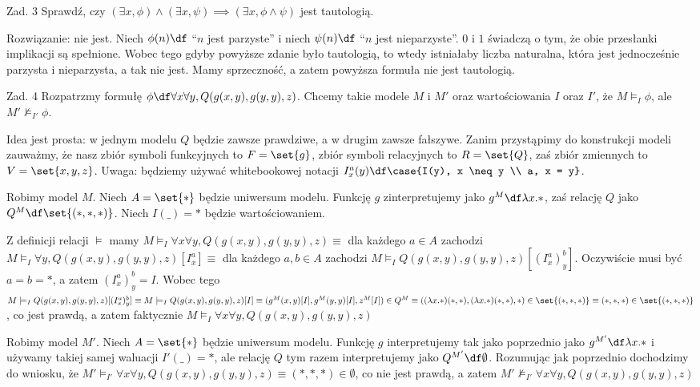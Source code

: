 \documentclass[11pt]{article}
\begin{document}
	\newpage
	
	\par Zad. 3 Sprawdź, czy $(\exists x, \phi) \land (\exists x, \psi) \implies (\exists x, \phi \land \psi)$ jest tautologią.
	\par Rozwiązanie: nie jest. Niech $\phi(n) \df $ ``$n$ jest parzyste'' i niech $\psi(n) \df $ ``$n$ jest nieparzyste''. $0$ i $1$ świadczą o tym, że obie przesłanki implikacji są spełnione. Wobec tego gdyby powyższe zdanie było tautologią, to wtedy istniałaby liczba naturalna, która jest jednocześnie parzysta i nieparzysta, a tak nie jest. Mamy sprzeczność, a zatem powyższa formuła nie jest tautologią.
	
	\newpage
	
	\par Zad. 4 Rozpatrzmy formułę $\phi \df \forall x \forall y, Q(g(x, y), g(y, y), z)$. Chcemy takie modele $M$ i $M'$ oraz wartościowania $I$ oraz $I'$, że $M \models_I \phi$, ale $M' \not\models_{I'} \phi$.
	\par Idea jest prosta: w jednym modelu $Q$ będzie zawsze prawdziwe, a w drugim zawsze fałszywe. Zanim przystąpimy do konstrukcji modeli zauważmy, że nasz zbiór symboli funkcyjnych to $F = \set{g}$, zbiór symboli relacyjnych to $R = \set{Q}$, zaś zbiór zmiennych to $V = \set{x, y, z}$. Uwaga: będziemy używać whitebookowej notacji $I_x^a(y) \df \case{I(y), x \neq y \\ a, x = y}$.
	\par Robimy model $M$. Niech $A = \set{*}$ będzie uniwersum modelu. Funkcję $g$ zinterpretujemy jako $g^M \df \lambda x.*$, zaś relację $Q$ jako $Q^M \df \set{(*, *, *)}$. Niech $I(\_) = *$ będzie wartościowaniem.
	\par Z definicji relacji $\models$ mamy $M \models_I \forall x \forall y, Q(g(x, y), g(y, y), z) \equiv $ dla każdego $a \in A$ zachodzi $M \models_I \forall y, Q(g(x, y), g(y, y), z)[I_x^a] \equiv $ dla każdego $a, b \in A$ zachodzi $M \models_I Q(g(x, y), g(y, y), z)[(I_x^a)_y^b]$. Oczywiście musi być $a = b = *$, a zatem $(I_x^a)_y^b = I$. Wobec tego $M \models_I Q(g(x, y), g(y, y), z)[(I_x^a)_y^b] \equiv M \models_I Q(g(x, y), g(y, y), z)[I] \equiv (g^M(x, y)[I], g^M(y, y)[I], z^M[I]) \in Q^M \equiv ((\lambda x.*)(*, *), (\lambda x.*)(*, *), *) \in \set{(*, *, *)} \equiv (*, *, *) \in \set{(*, *, *)}$, co jest prawdą, a zatem faktycznie $M \models_I \forall x \forall y, Q(g(x, y), g(y, y), z)$
	\par Robimy model $M'$. Niech $A = \set{*}$ będzie uniwersum modelu. Funkcję $g$ interpretujemy tak jako poprzednio jako $g^{M'} \df \lambda x.*$ i używamy takiej samej waluacji $I'(\_) = *$, ale relację $Q$ tym razem interpretujemy jako $Q^{M'} \df \emptyset$. Rozumując jak poprzednio dochodzimy do wniosku, że $M' \models_{I'} \forall x \forall y, Q(g(x, y), g(y, y), z) \equiv (*, *, *) \in \emptyset$, co nie jest prawdą, a zatem $M' \not\models_{I'} \forall x \forall y, Q(g(x, y), g(y, y), z)$
\end{document}
